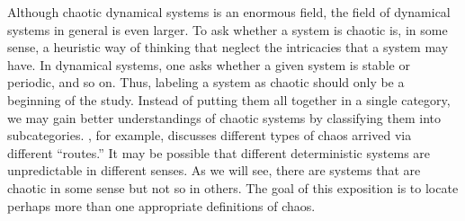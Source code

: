 \documentclass[10pt,twoside]{book}
\begin{document}
Although chaotic dynamical systems is an enormous field, the field of dynamical systems in general is even larger.
To ask whether a system is chaotic is, in some sense, a heuristic way of thinking that neglect the intricacies that a system may have.
In dynamical systems, one asks whether a given system is stable or periodic, and so on.
Thus, labeling a system as chaotic should only be a beginning of the study.
Instead of putting them all together in a single category, we may gain better understandings of chaotic systems by classifying them into subcategories.
\citet{devaney}, for example, discusses different types of chaos arrived via different ``routes.''
It may be possible that different deterministic systems are unpredictable in different senses.
As we will see, there are systems that are chaotic in some sense but not so in others.
The goal of this exposition is to locate perhaps more than one appropriate definitions of chaos.



\end{document}
